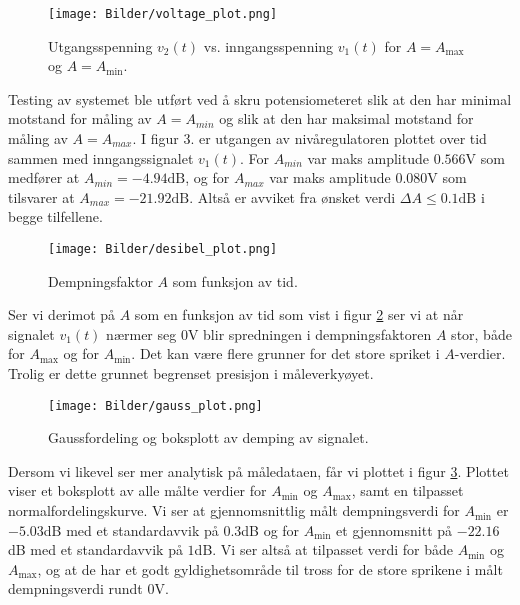\begin{figure}[H]
    \centering
    \texttt{[image: Bilder/voltage\_plot.png]}
    \caption{Utgangsspenning $v_2(t)$ vs. inngangsspenning $v_1(t)$ for $A = A_\text{max}$ og $A = A_\text{min}$.}
    \label{fig:volt_plot}
\end{figure}

Testing av systemet ble utført ved å skru potensiometeret slik at den har minimal motstand for måling av $A = A_{min}$ og slik at den har maksimal 
motstand for måling av $A = A_{max}$. I figur 3. er utgangen av nivåregulatoren plottet over tid sammen med inngangssignalet $v_1(t)$. For $A_{min}$ 
var maks amplitude $0.566\text{V}$ som medfører at $A_{min} = -4.94\text{dB}$, 
og for $A_{max}$ var maks amplitude $0.080 \text{V}$ som tilsvarer at 
$A_{max} = -21.92 \text{dB}$. Altså er avviket fra ønsket verdi 
$\Delta A \leq 0.1\text{dB}$ i begge tilfellene.

\begin{figure}[H]
    \centering
    \texttt{[image: Bilder/desibel\_plot.png]}
    \caption{Dempningsfaktor $A$ som funksjon av tid.}
    \label{fig:gain_plot}
\end{figure}

Ser vi derimot på $A$ som en funksjon av tid som vist i figur \ref{fig:gain_plot} ser vi at når signalet $v_1(t)$ nærmer seg 0V
blir spredningen i dempningsfaktoren $A$ stor, både for $A_\text{max}$ og for $A_\text{min}$.
Det kan være flere grunner for det store spriket i $A$-verdier. Trolig er dette grunnet begrenset presisjon 
i måleverkyøyet. 

\begin{figure}[H]
    \centering
    \texttt{[image: Bilder/gauss\_plot.png]}
    \caption{Gaussfordeling og boksplott av demping av signalet.}
    \label{fig:gaus_plot}
\end{figure}

Dersom vi likevel ser mer analytisk på måledataen, får vi plottet i figur \ref{fig:gaus_plot}. Plottet viser 
et boksplott av alle målte verdier for $A_\text{min}$ og $A_\text{max}$, samt en tilpasset normalfordelingskurve.
Vi ser at gjennomsnittlig målt dempningsverdi for $A_\text{min}$ er $-5.03$dB med et standardavvik på $0.3$dB og for $A_\text{min}$ et gjennomsnitt på
$-22.16$dB med et standardavvik på $1$dB. Vi ser altså at tilpasset verdi for både $A_\text{min}$ og $A_\text{max}$, og at 
de har et godt gyldighetsområde til tross for de store sprikene i målt dempningsverdi rundt $0$V.


